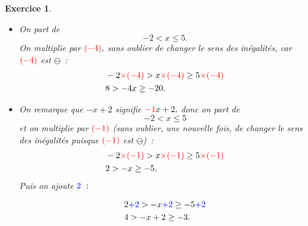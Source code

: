 \documentclass[10pt]{article}
\newtheorem{exo}{Exercice}
\begin{document}
\begin{exo}
\begin{enumerate}
\begin{itemize}
\item[\textbullet] On part de \[-2<x\leq 5.\] On multiplie par $\textcolor{red}{(-4)},$ \danger sans oublier de changer le sens des inégalités, car $\textcolor{red}{(-4)}$ est \Large$\ominus$\normalsize ~:
\begin{align*}
&-2\textcolor{red}{\times (-4)}> x\textcolor{red}{\times (-4)}\geq 5\textcolor{red}{\times (-4)}\\
&8> -4x\geq -20.\end{align*}
\item[\textbullet] On remarque que $-x+2$ signifie $\textcolor{red}{-1}x+2,$ donc on part de \[-2<x\leq 5\] et on multiplie par $\textcolor{red}{(-1)}$ (sans oublier, une nouvelle fois, de changer le sens des inégalités puisque $\textcolor{red}{(-1)}$ est \Large$\ominus$\normalsize)~:
\begin{align*}
&-2\textcolor{red}{\times (-1)}> x\textcolor{red}{\times (-1)}\geq 5\textcolor{red}{\times (-1)}\\
&2> -x\geq -5.\end{align*}
Puis on ajoute $\textcolor{blue}{2}~:$

\begin{align*}
&2\textcolor{blue}{+2}> -x\textcolor{blue}{+2}\geq -5\textcolor{blue}{+2}\\
&4> -x+2\geq -3.\end{align*}
\end{itemize}
\end{enumerate}

\end{exo}
\end{document}
